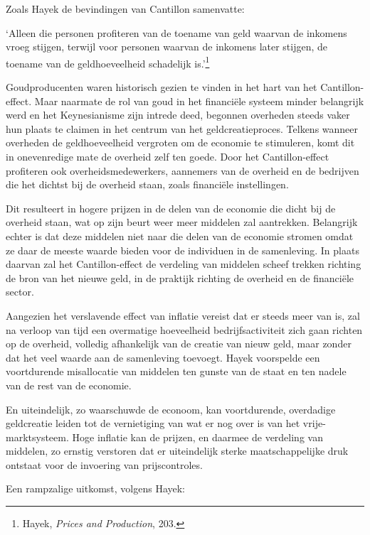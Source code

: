 \documentclass[
  a5paper,
  smalldemyvopaper,11pt,twoside,onecolumn,openright,extrafontsizes,
hidelinks]{memoir}
\renewenvironment{quote}%
               {\list{}{\rightmargin=.3cm\leftmargin=.3cm}%
                \itshape \item[]}%
               {\endlist}
\begin{document}
Zoals Hayek de bevindingen van Cantillon samenvatte:

\begin{quote}
`Alleen die personen profiteren van de toename van geld waarvan de
inkomens vroeg stijgen, terwijl voor personen waarvan de inkomens later
stijgen, de toename van de geldhoeveelheid schadelijk is.'\footnote{\hspace{0pt}Hayek,
  \emph{Prices and Production}, 203.}
\end{quote}

Goudproducenten waren historisch gezien te vinden in het hart van het
Cantillon-effect. Maar naarmate de rol van goud in het financiële
systeem minder belangrijk werd en het Keynesianisme zijn intrede deed,
begonnen overheden steeds vaker hun plaats te claimen in het centrum van
het geldcreatieproces. Telkens wanneer overheden de geldhoeveelheid
vergroten om de economie te stimuleren, komt dit in onevenredige mate de
overheid zelf ten goede. Door het Cantillon-effect profiteren ook
overheidsmedewerkers, aannemers van de overheid en de bedrijven die het
dichtst bij de overheid staan, zoals financiële instellingen.

Dit resulteert in hogere prijzen in de delen van de economie die dicht
bij de overheid staan, wat op zijn beurt weer meer middelen zal
aantrekken. Belangrijk echter is dat deze middelen niet naar die delen
van de economie stromen omdat ze daar de meeste waarde bieden voor de
individuen in de samenleving. In plaats daarvan zal het Cantillon-effect
de verdeling van middelen scheef trekken richting de bron van het nieuwe
geld, in de praktijk richting de overheid en de financiële sector.

Aangezien het verslavende effect van inflatie vereist dat er steeds meer
van is, zal na verloop van tijd een overmatige hoeveelheid
bedrijfsactiviteit zich gaan richten op de overheid, volledig
afhankelijk van de creatie van nieuw geld, maar zonder dat het veel
waarde aan de samenleving toevoegt. Hayek voorspelde een voortdurende
misallocatie van middelen ten gunste van de staat en ten nadele van de
rest van de economie.

En uiteindelijk, zo waarschuwde de econoom, kan voortdurende, overdadige
geldcreatie leiden tot de vernietiging van wat er nog over is van het
vrije-marktsysteem. Hoge inflatie kan de prijzen, en daarmee de
verdeling van middelen, zo ernstig verstoren dat er uiteindelijk sterke
maatschappelijke druk ontstaat voor de invoering van prijscontroles.

Een rampzalige uitkomst, volgens Hayek:
\end{document}
